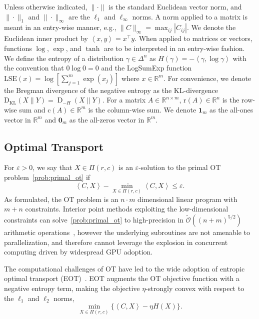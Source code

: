 \documentclass[10pt]{article}
\newcommand{\R}{\mathbb{R}}
\renewcommand{\O}{\mathcal{O}}
\newcommand{\tO}{\widetilde{\O}}
\newcommand{\inner}[2]{\left\langle #1,#2\right\rangle}
\newcommand{\coup}{\Pi}
\newcommand{\D}{\operatorname{D}}
\newcommand{\LSE}{\mathrm{LSE}}
\theoremstyle{plain}
\theoremstyle{definition}
\theoremstyle{remark}
\newcommand{\KL}{\mathrm{D}_\mathrm{KL}}
\newcommand{\one}{\mathbf{1}}
\newcommand{\zero}{\mathbf{0}}
\newcommand{\col}{\bm{\mathrm{c}}}
\newcommand{\row}{\bm{\mathrm{r}}}
\begin{document}
Unless otherwise indicated, $\|\cdot\|$ is the standard Euclidean vector norm, and $\|\cdot\|_1$ and $\|\cdot\|_\infty$ are the $\ell_1$ and $\ell_\infty$ norms. A norm applied to a matrix is meant in an entry-wise manner, e.g., $\|C\|_\infty=\max_{ij}|C_{ij}|$. We denote the Euclidean inner product by $\inner{x}{y}=x^\top y$. When applied to matrices or vectors, functions $\log$, $\exp$, and $\tanh$ are to be interpreted in an entry-wise fashion. We define the entropy of a distribution $\gamma\in\Delta^n$ as $H(\gamma)=-\inner{\gamma}{\log \gamma}$ with the convention that $0\log 0=0$ and the LogSumExp function $\LSE(x)=\log\left[\sum_{j=1}^m\exp(x_j)\right]$ where $x\in\R^m$. For convenience, we denote the Bregman divergence of the negative entropy as the KL-divergence $\KL(X\|Y)=\D_{-H}(X\|Y)$. For a matrix $A\in \R^{n\times m}$, $\row(A)\in\R^n$ is the row-wise sum and $\col(A)\in\R^m$ is the column-wise sum. We denote $\one_m$ as the all-ones vector in $\R^m$ and $\zero_m$ as the all-zeros vector in $\R^m$.


\subsection{Optimal Transport}
For $\varepsilon>0$, we say that $X\in\coup(r,c)$ is an $\varepsilon$-solution to the primal OT problem~\eqref{prob:primal_ot} if
\[\inner{C}{X}-\min_{X\in\coup(r,c)}\inner{C}{X}\leq \varepsilon.\]
As formulated, the OT problem is an $n\cdot m$ dimensional linear program with $m+n$ constraints. Interior point methods exploiting the low-dimensional constraints can solve~\eqref{prob:primal_ot} to high-precision in $\tO((n+m)^{5/2})$ arithmetic operations~\cite{leePathFindingMethods2014}, however the underlying subroutines are not amenable to parallelization, and therefore cannot leverage the explosion in concurrent computing driven by widespread GPU adoption.


The computational challenges of OT have led to the wide adoption of entropic optimal transport (EOT)~\cite{cuturiSinkhornDistancesLightspeed2013,nutzIntroductionEntropicOptimal}. EOT augments the OT objective function with a negative entropy term, making the objective $\eta $-strongly convex with respect to the $\ell_1$ and $\ell_2$ norms,
\begin{equation}
    \min_{X\in\coup(r,c)}\{\inner{C}{X}-\eta  H(X)\}\label{prob:primal_eot}.
\end{equation}
\end{document}
